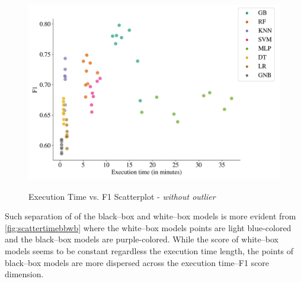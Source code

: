 \begin{figure}[H]
\centering
\caption{Execution Time vs. F1 Scatterplot - \textit{without outlier}}\vspace{0.5em}
\label{fig:scattertime}\
\includegraphics[width=140mm]{Figures/Scatterplot_execution_time_F1_wo_outliers.jpg}

\vspace{-1em}
\end{figure}
Such separation of of the black--box and white--box models is more evident from \autoref{fig:scattertimebbwb} where the white--box models points are light blue-colored and the black--box models are purple-colored.
While the score of white--box models seems to be constant regardless the execution time length, the points of black--box models are more dispersed across the execution time--F1 score dimension.

